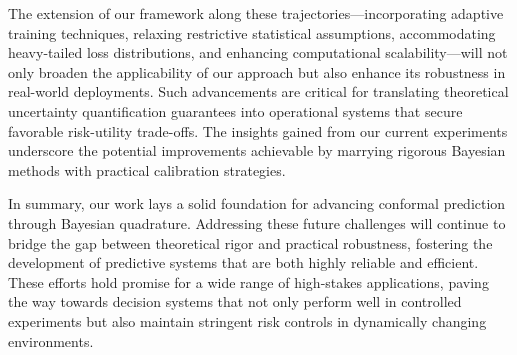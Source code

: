 \documentclass{article}
\begin{document}
The extension of our framework along these trajectories—incorporating adaptive training techniques, relaxing restrictive statistical assumptions, accommodating heavy-tailed loss distributions, and enhancing computational scalability—will not only broaden the applicability of our approach but also enhance its robustness in real-world deployments. Such advancements are critical for translating theoretical uncertainty quantification guarantees into operational systems that secure favorable risk-utility trade-offs. The insights gained from our current experiments underscore the potential improvements achievable by marrying rigorous Bayesian methods with practical calibration strategies.

In summary, our work lays a solid foundation for advancing conformal prediction through Bayesian quadrature. Addressing these future challenges will continue to bridge the gap between theoretical rigor and practical robustness, fostering the development of predictive systems that are both highly reliable and efficient. These efforts hold promise for a wide range of high-stakes applications, paving the way towards decision systems that not only perform well in controlled experiments but also maintain stringent risk controls in dynamically changing environments.
\end{document}
